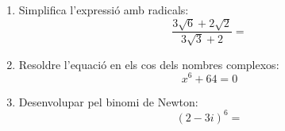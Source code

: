 \documentclass[12pt,a4paper]{article}
\begin{document}
\begin{enumerate}[label=\textbf{\arabic*.}]
    \item Simplifica l'expressió amb radicals:
    \[
    \frac{3\sqrt{6}+2\sqrt{2}}{3\sqrt{3}+2} =
    \]

    \item Resoldre l'equació en els cos dels nombres complexos:
    \[
    x^{6}+64=0
    \]

    \item Desenvolupar pel binomi de Newton:
    \[
    (2-3i)^{6} =
    \]

\end{enumerate}
\end{document}
